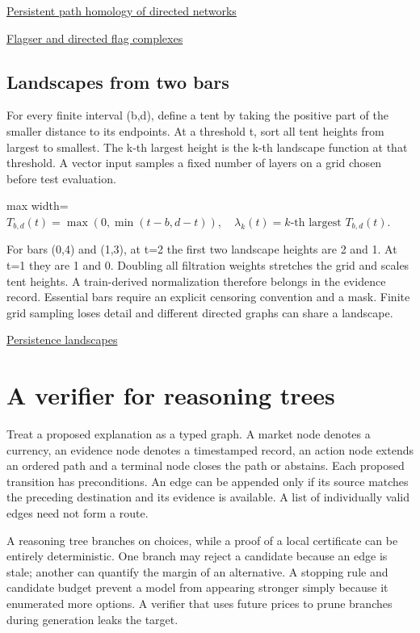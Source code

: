 \documentclass[11pt,oneside,openany]{book}
\begin{document}
{\small\sffamily\href{https://arxiv.org/abs/1701.00565}{Persistent path homology of directed networks}\par}
{\small\sffamily\href{https://arxiv.org/abs/1906.10458}{Flagser and directed flag complexes}\par}
\section*{Landscapes from two bars}
For every finite interval (b,d), define a tent by taking the positive part of the smaller distance to its endpoints. At a threshold t, sort all tent heights from largest to smallest. The k-th largest height is the k-th landscape function at that threshold. A vector input samples a fixed number of layers on a grid chosen before test evaluation.

\begin{center}\begin{adjustbox}{max width=\linewidth}$\displaystyle T_{b,d}(t)=\max(0,\min(t-b,d-t)),\quad\lambda_k(t)=k\text{-th largest }T_{b,d}(t).$\end{adjustbox}\end{center}
For bars (0,4) and (1,3), at t=2 the first two landscape heights are 2 and 1. At t=1 they are 1 and 0. Doubling all filtration weights stretches the grid and scales tent heights. A train-derived normalization therefore belongs in the evidence record. Essential bars require an explicit censoring convention and a mask. Finite grid sampling loses detail and different directed graphs can share a landscape.

{\small\sffamily\href{https://arxiv.org/abs/1207.6437}{Persistence landscapes}\par}
\chapter{A verifier for reasoning trees}
Treat a proposed explanation as a typed graph. A market node denotes a currency, an evidence node denotes a timestamped record, an action node extends an ordered path and a terminal node closes the path or abstains. Each proposed transition has preconditions. An edge can be appended only if its source matches the preceding destination and its evidence is available. A list of individually valid edges need not form a route.

A reasoning tree branches on choices, while a proof of a local certificate can be entirely deterministic. One branch may reject a candidate because an edge is stale; another can quantify the margin of an alternative. A stopping rule and candidate budget prevent a model from appearing stronger simply because it enumerated more options. A verifier that uses future prices to prune branches during generation leaks the target.
\end{document}
